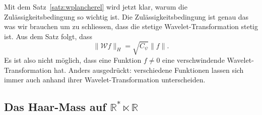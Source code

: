 Mit dem Satz~\ref{satz:wplancherel} wird jetzt klar, warum die
Zulässigkeitsbedingung so wichtig ist.
Die Zulässigkeitsbedingung ist genau das was wir brauchen um zu schliessen,
dass die stetige Wavelet-Transformation stetig ist.
Aus dem Satz folgt, dass
\[
\| \mathcal{W}f \|_H = \sqrt{C_{\psi}}\|f\|.
\]
Es ist also nicht möglich, dass eine Funktion $f\ne 0$ eine verschwindende
Wavelet-Transformation hat.
Anders ausgedrückt: verschiedene Funktionen lassen sich immer auch anhand
ihrer Wavelet-Transformation unterscheiden.

\subsection{Das Haar-Mass auf $\mathbb R^* \ltimes \mathbb R$
\label{subsection:haar-mass}}








